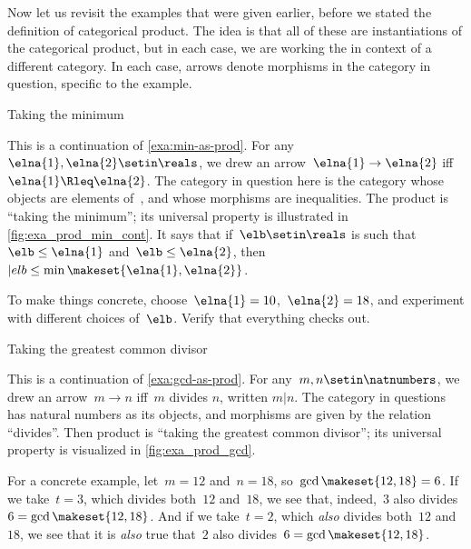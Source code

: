 Now let us revisit the examples that were given earlier, before we stated the definition of categorical product.
The idea is that all of these are instantiations of the categorical product, but in each case, we are working the in context of a different category.
In each case, arrows denote morphisms in the category in question, specific to the example.

\begin{marginfigure}
    \centering
    \caption{Taking the minimum}
    \label{fig:exa_prod_min_cont}
\end{marginfigure}

\begin{example}
    \label{exa:min-as-prod-cont}
    This is a continuation of \cref{exa:min-as-prod}.
    For any~$\elna{1},\elna{2}\setin \reals$, we drew an arrow~$\elna{1}\to \elna{2}$ iff~$\elna{1}\Rleq \elna{2}$.
    The category in question here is the category whose objects are elements of~\reals, and whose morphisms are inequalities.
    The product is ``taking the minimum'';
    its universal property is illustrated in \cref{fig:exa_prod_min_cont}.
    It says that if~$\elb \setin \reals$ is such that~$\elb \leq \elna{1}$ and~$\elb \leq \elna{2}$, then~$|elb \leq \min \makeset{ \elna{1}, \elna{2} }$.

    To make things concrete, choose~$\elna{1} = 10$,~$\elna{2} = 18$, and experiment with different choices of~$\elb$.
    Verify that everything checks out.
\end{example}

\begin{marginfigure}
    \centering
    \caption{Taking the greatest common divisor}
    \label{fig:exa_prod_gcd_cont}
\end{marginfigure}

\begin{example}
    \label{exa:gcd-as-prod-cont}
    This is a continuation of \cref{exa:gcd-as-prod}.
    For any~$m, n \setin \natnumbers$, we drew an arrow~$m \to n$ iff~$m$ divides $n$, written $m | n$.
    The category in questions has natural numbers as its objects, and morphisms are given by the relation ``divides''.
    Then product is ``taking the greatest common divisor''; its universal property is visualized in \cref{fig:exa_prod_gcd}.

    For a concrete example, let~$m = 12$ and~$n = 18$, so~$\gcd \makeset{12, 18 } = 6$.
    If we take~$t = 3$, which divides both~$12$ and~$18$, we see that, indeed,~$3$ also divides~$6 = \gcd \makeset{12, 18 }$.
    And if we take~$t = 2$, which \emph{also} divides both~$12$ and~$18$, we see that it is \emph{also} true that~$2$ also divides~$6 = \gcd \makeset{12, 18 }$.
\end{example}

